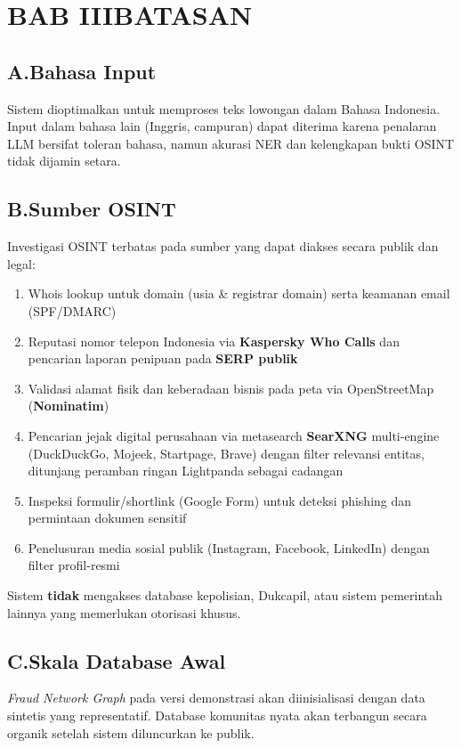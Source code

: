 \documentclass[12pt,a4paper]{article}
\begin{document}
\section*{BAB III\quad BATASAN}

\subsection*{A.\quad Bahasa Input}
Sistem dioptimalkan untuk memproses teks lowongan dalam Bahasa Indonesia. Input dalam bahasa
lain (Inggris, campuran) dapat diterima karena penalaran LLM bersifat toleran
bahasa, namun akurasi NER dan kelengkapan bukti OSINT tidak dijamin setara.

\subsection*{B.\quad Sumber OSINT}
Investigasi OSINT terbatas pada sumber yang dapat diakses secara publik dan legal:
\begin{enumerate}[label=\textbf{\arabic*.}]
  \item Whois lookup untuk domain (usia \& registrar domain) serta keamanan email (SPF/DMARC)
  \item Reputasi nomor telepon Indonesia via \textbf{Kaspersky Who Calls} dan pencarian
        laporan penipuan pada \textbf{SERP publik}
  \item Validasi alamat fisik dan keberadaan bisnis pada peta via OpenStreetMap (\textbf{Nominatim})
  \item Pencarian jejak digital perusahaan via metasearch \textbf{SearXNG} multi-engine
        (DuckDuckGo, Mojeek, Startpage, Brave) dengan filter relevansi entitas, ditunjang
        peramban ringan Lightpanda sebagai cadangan
  \item Inspeksi formulir/shortlink (Google Form) untuk deteksi phishing dan permintaan dokumen sensitif
  \item Penelusuran media sosial publik (Instagram, Facebook, LinkedIn) dengan filter profil-resmi
\end{enumerate}
Sistem \textbf{tidak} mengakses database kepolisian, Dukcapil, atau sistem pemerintah lainnya
yang memerlukan otorisasi khusus.

\subsection*{C.\quad Skala Database Awal}
\textit{Fraud Network Graph} pada versi demonstrasi akan diinisialisasi dengan data sintetis
yang representatif. Database komunitas nyata akan terbangun secara organik setelah sistem
diluncurkan ke publik.
\end{document}
